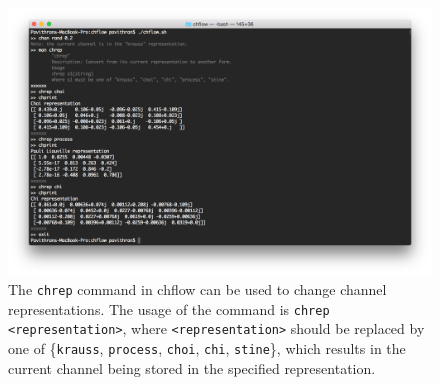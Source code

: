 \documentclass[12pt]{article}
\begin{document}
\begin{figure}[H]
\begin{center}
\includegraphics[scale=0.2]{chreps_screen.jpg}
\caption{The \texttt{chrep} command in chflow can be used to change channel representations. The usage of the command is \texttt{chrep <representation>}, where \texttt{<representation>} should be replaced by one of \{\texttt{krauss}, \texttt{process}, \texttt{choi}, \texttt{chi}, \texttt{stine}\}, which results in the current channel being stored in the specified representation.}
\label{fig:chrep_screen}
\end{center}
\end{figure}
\end{document}
